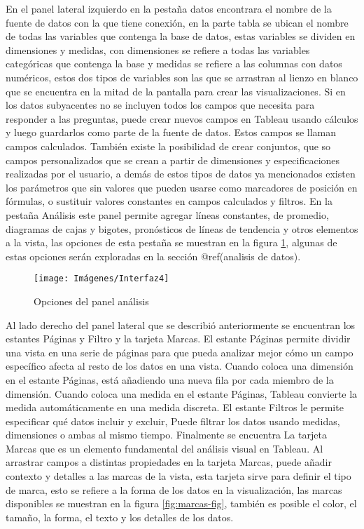 \documentclass[
]{book}
\begin{document}
En el panel lateral izquierdo en la pestaña datos encontrara el nombre de la fuente de datos con la que tiene conexión, en la parte tabla se ubican el nombre de todas las variables que contenga la base de datos, estas variables se dividen en dimensiones y medidas, con dimensiones se refiere a todas las variables categóricas que contenga la base y medidas se refiere a las columnas con datos numéricos, estos dos tipos de variables son las que se arrastran al lienzo en blanco que se encuentra en la mitad de la pantalla para crear las visualizaciones. Si en los datos subyacentes no se incluyen todos los campos que necesita para responder a las preguntas, puede crear nuevos campos en Tableau usando cálculos y luego guardarlos como parte de la fuente de datos. Estos campos se llaman campos calculados. También existe la posibilidad de crear conjuntos, que so campos personalizados que se crean a partir de dimensiones y especificaciones realizadas por el usuario, a demás de estos tipos de datos ya mencionados existen los parámetros que sin valores que pueden usarse como marcadores de posición en fórmulas, o sustituir valores constantes en campos calculados y filtros. En la pestaña Análisis este panel permite agregar líneas constantes, de promedio, diagramas de cajas y bigotes, pronósticos de líneas de tendencia y otros elementos a la vista, las opciones de esta pestaña se muestran en la figura \ref{fig:analisis-fig}, algunas de estas opciones serán exploradas en la sección @ref(analisis de datos).

\begin{figure}

{\centering \texttt{[image: Imágenes/Interfaz4]} 

}

\caption{Opciones del panel análisis}\label{fig:analisis-fig}
\end{figure}

Al lado derecho del panel lateral que se describió anteriormente se encuentran los estantes Páginas y Filtro y la tarjeta Marcas. El estante Páginas permite dividir una vista en una serie de páginas para que pueda analizar mejor cómo un campo específico afecta al resto de los datos en una vista. Cuando coloca una dimensión en el estante Páginas, está añadiendo una nueva fila por cada miembro de la dimensión. Cuando coloca una medida en el estante Páginas, Tableau convierte la medida automáticamente en una medida discreta. El estante Filtros le permite especificar qué datos incluir y excluir, Puede filtrar los datos usando medidas, dimensiones o ambas al mismo tiempo. Finalmente se encuentra La tarjeta Marcas que es un elemento fundamental del análisis visual en Tableau. Al arrastrar campos a distintas propiedades en la tarjeta Marcas, puede añadir contexto y detalles a las marcas de la vista, esta tarjeta sirve para definir el tipo de marca, esto se refiere a la forma de los datos en la visualización, las marcas disponibles se muestran en la figura \ref{fig:marcas-fig}, también es posible el color, el tamaño, la forma, el texto y los detalles de los datos.
\end{document}
